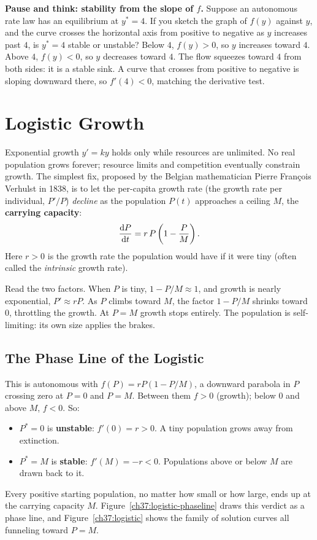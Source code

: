 \begin{recoverybox}
\textbf{Pause and think: stability from the slope of $f$.}
Suppose an autonomous rate law has an equilibrium at $y^* = 4$. If you sketch the
graph of $f(y)$ against $y$, and the curve crosses the horizontal axis from positive
to negative as $y$ increases past $4$, is $y^*=4$ stable or unstable?
Below $4$, $f(y) > 0$, so $y$ increases toward $4$. Above $4$, $f(y) < 0$, so $y$
decreases toward $4$. The flow squeezes toward $4$ from both sides: it is a stable
sink. A curve that crosses from positive to negative is sloping downward there, so
$f'(4) < 0$, matching the derivative test.
\end{recoverybox}

\section{Logistic Growth}

Exponential growth $y'=ky$ holds only while resources are unlimited. No real
population grows forever; resource limits and competition eventually constrain growth. The simplest
fix, proposed by the Belgian mathematician Pierre Fran\c{c}ois Verhulst in 1838, is
to let the per-capita growth rate (the growth rate per individual, $P'/P$)
\emph{decline} as the population $P(t)$ approaches a
ceiling $M$, the \textbf{carrying capacity}:
\[
  \frac{\mathrm{d} P}{\mathrm{d} t} = r\,P\left(1 - \frac{P}{M}\right).
\]
Here $r>0$ is the growth rate the population would have if it were tiny (often
called the \emph{intrinsic} growth rate).

\begin{intuitionbox}
Read the two factors. When $P$ is tiny, $1-P/M\approx 1$, and growth is nearly
exponential, $P'\approx rP$. As $P$ climbs toward
$M$, the factor $1-P/M$ shrinks toward $0$, throttling the growth. At $P=M$ growth
stops entirely. The population is self-limiting: its own size applies the brakes.
\end{intuitionbox}

\subsection{The Phase Line of the Logistic}

This is autonomous with $f(P)=rP(1-P/M)$, a downward parabola in $P$ crossing zero
at $P=0$ and $P=M$. Between them $f>0$ (growth); below $0$ and above $M$, $f<0$. So:
\begin{itemize}
\item $P^*=0$ is \textbf{unstable}: $f'(0)=r>0$. A tiny population grows away from
extinction.
\item $P^*=M$ is \textbf{stable}: $f'(M)=-r<0$. Populations above or below $M$ are
drawn back to it.
\end{itemize}
Every positive starting population, no matter how small or how large, ends up at the
carrying capacity $M$. Figure~\ref{ch37:logistic-phaseline} draws this verdict as a
phase line, and Figure~\ref{ch37:logistic} shows the family of solution curves all
funneling toward $P=M$.


